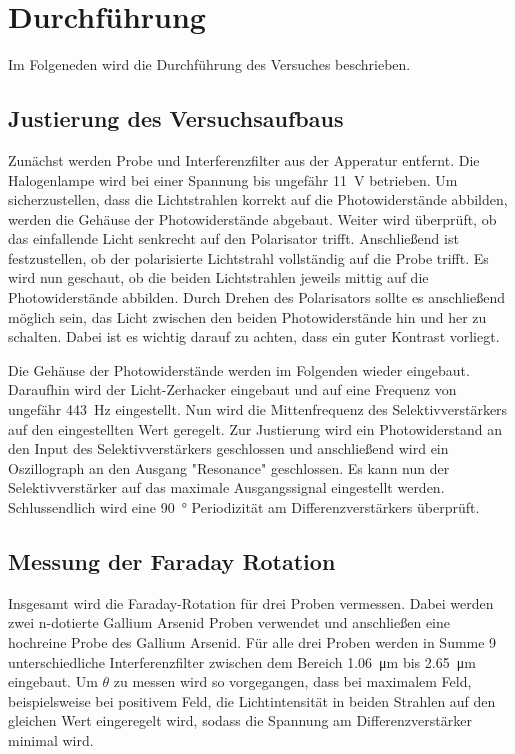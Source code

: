\section{Durchführung}
\label{sec:durchführung}

Im Folgeneden wird die Durchführung des Versuches beschrieben.

\subsection{Justierung des Versuchsaufbaus}
\label{sec:Justierung}

Zunächst werden Probe und Interferenzfilter aus der Apperatur entfernt. Die Halogenlampe wird bei einer
Spannung bis ungefähr \qty{11}{\volt} betrieben. Um sicherzustellen, dass die Lichtstrahlen korrekt auf die 
Photowiderstände abbilden, werden die Gehäuse der Photowiderstände abgebaut.
Weiter wird überprüft, ob das einfallende Licht senkrecht auf den Polarisator trifft.
Anschließend ist festzustellen, ob der polarisierte Lichtstrahl vollständig auf die Probe trifft.
Es wird nun geschaut, ob die beiden Lichtstrahlen jeweils mittig auf die Photowiderstände abbilden.
Durch Drehen des Polarisators sollte es anschließend möglich sein, das Licht zwischen den beiden Photowiderstände
hin und her zu schalten. Dabei ist es wichtig darauf zu achten, dass ein guter Kontrast vorliegt.

Die Gehäuse der Photowiderstände werden im Folgenden wieder eingebaut.
Daraufhin wird der Licht-Zerhacker eingebaut und auf eine Frequenz von ungefähr
\qty{443}{\hertz} eingestellt. Nun wird die Mittenfrequenz des Selektivverstärkers auf den eingestellten Wert geregelt.
Zur Justierung wird ein Photowiderstand an den Input des Selektivverstärkers geschlossen und anschließend
wird ein Oszillograph an den Ausgang "Resonance" geschlossen. Es kann nun der Selektivverstärker auf
das maximale Ausgangssignal eingestellt werden.
Schlussendlich wird eine \qty{90}{\degree} Periodizität am Differenzverstärkers überprüft.

\subsection{Messung der Faraday Rotation}
\label{sec:Faraday Rotation}

Insgesamt wird die Faraday-Rotation für drei Proben vermessen. Dabei werden zwei n-dotierte Gallium Arsenid Proben 
verwendet und anschließen eine hochreine Probe des Gallium Arsenid.
Für alle drei Proben werden in Summe 9 unterschiedliche Interferenzfilter zwischen dem Bereich \qty{1.06}{\micro\meter} 
bis \qty{2.65}{\micro\meter} eingebaut. Um $\theta$ zu messen wird so vorgegangen, dass bei maximalem Feld, beispielsweise bei
positivem Feld, die Lichtintensität in beiden Strahlen auf den gleichen Wert eingeregelt wird, sodass die Spannung am 
Differenzverstärker minimal wird.

